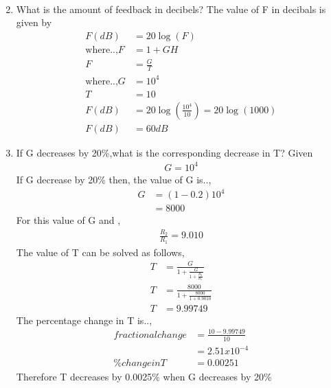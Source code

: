 \begin{enumerate}[label=\thesubsection.\arabic*.,ref=\thesubsection.\theenumi]
\begin{align}
\end{align}
\item What is the amount of feedback in decibels?
\solution The value of F in decibals is given by 
\begin{align}
    F(dB) &= 20\log(F)\\
\text{where..,} F &= 1+GH \\
F &= \frac{G}{T}\\
\text{where..,} G&=10^4 \\ T &= 10\\
F(dB) &= 20\log(\frac{10^4}{10})=20\log(1000)\\
F(dB) &= 60 dB
\end{align}
\item If G decreases by 20\%,what is the corresponding decrease in T?
\solution Given
\begin{align}
G = 10^4
\end{align}
If G decrease by 20\% then,
the value of G is..,
\begin{align}
    G &= (1-0.2)10^4 \\
      &= 8000
\end{align}
For this value of G and ,
\begin{align}
    \frac{R_2}{R_1} = 9.010
\end{align}
The value of T can be solved as follows,
\begin{align}
 T &= \frac{G}{1+\frac{G}{1+\frac{R_2}{R_1}}}\\
 T &= \frac{8000}{1+\frac{8000}{1+0.9010}}\\
 T &= 9.99749
\end{align}
The percentage change in T is..,
\begin{align}
    fractionalchange &= \frac{10-9.99749}{10}\\
      &= 2.51x10^{-4}\\
     \% change in T &= 0.00251
\end{align}
Therefore T decreases by 0.0025\% when G decreases by 20\%
\end{enumerate}

